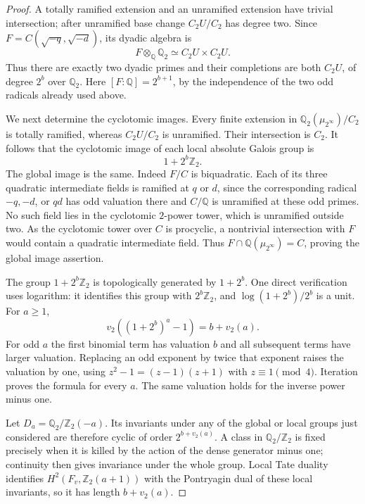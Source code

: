 \begin{proof}
A totally ramified extension and an unramified extension have trivial
intersection; after unramified base change \(C_2U/C_2\) has degree
two. Since \(F=C(\sqrt{-q},\sqrt{-d})\), its dyadic algebra is
\[
              F\otimes_{\mathbb Q}\mathbb Q_2
                     \simeq C_2U\times C_2U .
\]
Thus there are exactly two dyadic primes and their completions are
both \(C_2U\), of degree \(2^b\) over \(\mathbb Q_2\).
Here \([F:\mathbb Q]=2^{b+1}\), by the independence of the two
odd radicals already used above.

We next determine the cyclotomic images. Every finite extension in
\(\mathbb Q_2(\mu_{2^\infty})/C_2\) is totally ramified, whereas
\(C_2U/C_2\) is unramified. Their intersection is \(C_2\).
It follows that the cyclotomic image of each local absolute Galois
group is
\[
                    1+2^b\mathbb Z_2 .
\]
The global image is the same. Indeed \(F/C\) is biquadratic.
Each of its three quadratic intermediate fields is ramified at
\(q\) or \(d\), since the corresponding radical
\(-q,-d\), or \(qd\) has odd valuation there and \(C/\mathbb Q\)
is unramified at these odd primes.
No such field lies in the cyclotomic \(2\)-power tower, which is
unramified outside two.
As the cyclotomic tower over \(C\) is procyclic, a nontrivial
intersection with \(F\) would contain a quadratic intermediate
field. Thus \(F\cap\mathbb Q(\mu_{2^\infty})=C\), proving the
global image assertion.

The group \(1+2^b\mathbb Z_2\) is topologically generated by
\(1+2^b\). One direct verification uses logarithm: it identifies
this group with \(2^b\mathbb Z_2\), and
\(\log(1+2^b)/2^b\) is a unit.
For \(a\geq1\),
\[
                 v_2((1+2^b)^a-1)=b+v_2(a).
\]
For odd \(a\) the first binomial term has valuation \(b\) and all
subsequent terms have larger valuation.
Replacing an odd exponent by twice that exponent raises the valuation
by one, using \(z^2-1=(z-1)(z+1)\) with \(z\equiv1\pmod4\).
Iteration proves the formula for every \(a\).
The same valuation holds for the inverse power minus one.

Let \(D_a=\mathbb Q_2/\mathbb Z_2(-a)\).
Its invariants under any of the global or local groups just
considered are therefore cyclic of order
\(2^{b+v_2(a)}\). A class in \(\mathbb Q_2/\mathbb Z_2\)
is fixed precisely when it is killed by the action of the dense
generator minus one; continuity then gives invariance under the
whole group. Local Tate duality identifies
\(H^2(F_v,\mathbb Z_2(a+1))\) with the Pontryagin dual of these
local invariants, so it has length \(b+v_2(a)\).


\end{proof}
